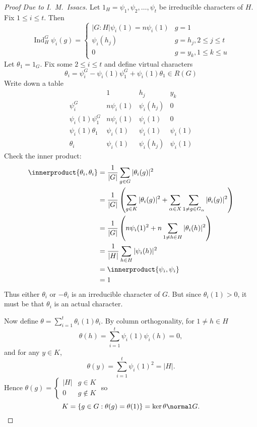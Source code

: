 \documentclass[a4paper]{article}
\newcommand*{\ip}{\innerproduct} %
\DeclareMathOperator{\Ind}{Ind} %
\theoremstyle{definition}
\begin{document}
\begin{proof}[Proof Due to I.\ M.\ Issacs]
  Let \(1_H = \psi_1, \psi_2, \dots, \psi_t\) be irreducible characters of \(H\). Fix \(1 \leq i \leq t\). Then
  \[
    \Ind_H^G \psi_i(g) =
    \begin{cases}
      |G: H| \psi_i(1) = n \psi_i(1) & g = 1 \\
      \psi_i(h_j) & g = h_j, 2 \leq j \leq t \\
      0 & g = y_k, 1 \leq k \leq u
    \end{cases}
  \]
  Let \(\theta_1 = 1_G\). Fix some \(2 \leq i \leq t\) and define virtual characters
  \[
    \theta_i = \psi_i^G - \psi_i(1) \psi_1^G + \psi_i(1) \theta_1 \in R(G)
  \]
  Write down a table
  \[
    \begin{array}{r|cccc}
      & 1 & h_j & y_k \\ \hline
      \psi_i^G & n \psi_i(1) & \psi_i(h_j) & 0 \\
      \psi_i(1) \psi_1^G & n\psi_i(1) & \psi_i(1) & 0 \\
      \psi_i(1) \theta_1 & \psi_i(1) & \psi_i(1) & \psi_i(1) \\ \hline
      \theta_i & \psi_i(1) & \psi_i(h_j) & \psi_i(1)
    \end{array}
  \]
  Check the inner product:
  \begin{align*}
    \ip{\theta_i, \theta_i}
    &= \frac{1}{|G|} \sum_{g \in G} |\theta_i(g)|^2 \\
    &= \frac{1}{|G|} \left( \sum_{g \in K} |\theta_i(g)|^2 + \sum_{\alpha \in X} \sum_{1 \neq g \in G_\alpha} |\theta_i(g)|^2 \right) \\
    &= \frac{1}{|G|} \left( n \psi_i(1)^2 + n \sum_{1 \neq h \in H} |\theta_i(h)|^2 \right) \\
    &= \frac{1}{|H|} \sum_{h \in H} |\psi_i(h)|^2 \\
    &= \ip{\psi_i, \psi_i} \\
    &= 1
  \end{align*}
  Thus either \(\theta_i\) or \(-\theta_i\) is an irreducible character of \(G\). But since \(\theta_i(1) > 0\), it must be that \(\theta_i\) is an actual character.

  Now define \(\theta = \sum_{i = 1}^t \theta_i(1) \theta_i\). By column orthogonality, for \(1 \neq h \in H\)
  \[
    \theta(h) = \sum_{i = 1}^t \psi_i(1) \psi_i(h) = 0,
  \]
  and for any \(y \in K\),
  \[
    \theta(y) = \sum_{i = 1}^t \psi_i(1)^2 = |H|.
  \]
  Hence \(\theta(g) =
  \begin{cases}
    |H| & g \in K \\
    0 & g \notin K
  \end{cases}
  \) so
  \[
    K = \{g \in G: \theta(g) = \theta(1)\} = \ker \theta \normal G.
  \]
\end{proof}
\end{document}

